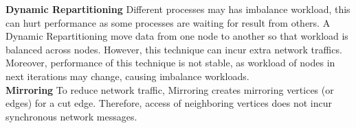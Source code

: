 \textbf{Dynamic Repartitioning}
Different processes may has imbalance workload, this can hurt performance
as some processes are waiting for result from others. A Dynamic Repartitioning
move data from one node to another so that workload is balanced across
nodes. However, this technique can incur extra network traffics. Moreover,
performance of this technique is not stable, as workload of nodes in next
iterations may change, causing imbalance workloads.\\
\textbf{Mirroring}
To reduce network traffic, Mirroring creates mirroring vertices (or edges)
for a cut edge. Therefore, access of neighboring vertices does not
incur synchronous network messages.

